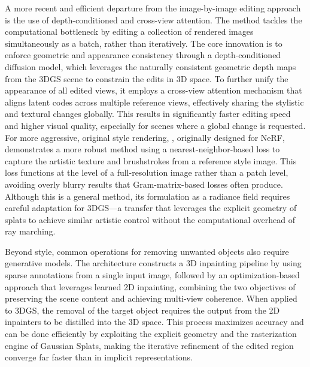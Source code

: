\documentclass[11pt,a4paper]{article}
\begin{document}
A more recent and efficient departure from the image-by-image editing approach is the use of depth-conditioned and cross-view attention. The \cite{arxiv:2403.08733v3} method tackles the computational bottleneck by editing a collection of rendered images simultaneously as a batch, rather than iteratively. The core innovation is to enforce geometric and appearance consistency through a depth-conditioned diffusion model, which leverages the naturally consistent geometric depth maps from the 3DGS scene to constrain the edits in 3D space. To further unify the appearance of all edited views, it employs a cross-view attention mechanism that aligns latent codes across multiple reference views, effectively sharing the stylistic and textural changes globally. This results in significantly faster editing speed and higher visual quality, especially for scenes where a global change is requested. For more aggressive, original style rendering, \cite{arxiv:2206.06360v1}, originally designed for NeRF, demonstrates a more robust method using a nearest-neighbor-based loss to capture the artistic texture and brushstrokes from a reference style image. This loss functions at the level of a full-resolution image rather than a patch level, avoiding overly blurry results that Gram-matrix-based losses often produce. Although this is a general method, its formulation as a radiance field requires careful adaptation for 3DGS---a transfer that leverages the explicit geometry of splats to achieve similar artistic control without the computational overhead of ray marching.

Beyond style, common operations for removing unwanted objects also require generative models. The \cite{arxiv:2211.12254v2} architecture constructs a 3D inpainting pipeline by using sparse annotations from a single input image, followed by an optimization-based approach that leverages learned 2D inpainting, combining the two objectives of preserving the scene content and achieving multi-view coherence. When applied to 3DGS, the removal of the target object requires the output from the 2D inpainters to be distilled into the 3D space. This process maximizes accuracy and can be done efficiently by exploiting the explicit geometry and the rasterization engine of Gaussian Splats, making the iterative refinement of the edited region converge far faster than in implicit representations.
\end{document}
